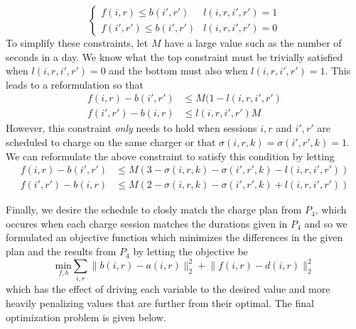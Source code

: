 \begin{equation}
	\begin{cases}
		f(i,r) \le b(i',r') & l(i,r,i',r') = 1 \\
		f(i',r') \le b(i',r') & l(i,r,i',r') = 0 
	\end{cases}
\end{equation}
To simplify these constraints, let $M$ have a large value such as the number of seconds in a day. We know what the top constraint must be trivially satisfied when $l(i,r,i',r') = 0$ and the bottom must also when $l(i,r,i',r') = 1$.  This leads to a reformulation so that
\begin{equation*}\begin{aligned}
		f(i,r) - b(i',r') & \le M(1 - l(i,r,i',r')\\
		f(i',r') - b(i,r) & \le l(i,r,i',r')M  
\end{aligned}\end{equation*}
However, this constraint {\it only} needs to hold when sessions $i,r$ and $i',r'$ are scheduled to charge on the same charger or that $\sigma(i,r,k) = \sigma(i',r',k) = 1$. We can reformulate the above constraint to satisfy this condition by letting
\begin{equation}\label{eqn:assignment:eqn5}\begin{aligned}
	f(i,r) - b(i',r') & \le M(3 - \sigma(i,r,k) - \sigma(i',r',k) - l(i,r,i',r')) \\
	f(i',r') - b(i,r) & \le M(2 - \sigma(i,r,k) - \sigma(i',r',k) + l(i,r,i',r'))
\end{aligned}\end{equation}
\par Finally, we desire the schedule to closly match the charge plan from $P_4$, which occures when each charge session matches the durations given in $P_4$ and so we formulated an objective function which minimizes the differences in the given plan and the results from $P_4$ by letting the objective be
\begin{equation}\label{eqn:assignment:eqn6}
	\underset{f,b}{\text{min}} \sum_{i,r}\lVert b(i,r) - a(i,r)\rVert_2^2 + \lVert f(i,r) - d(i,r) \rVert_2^2
\end{equation}
which has the effect of driving each variable to the desired value and more heavily penalizing values that are further from their optimal.
The final optimization problem is given below.\\[0.1in]
